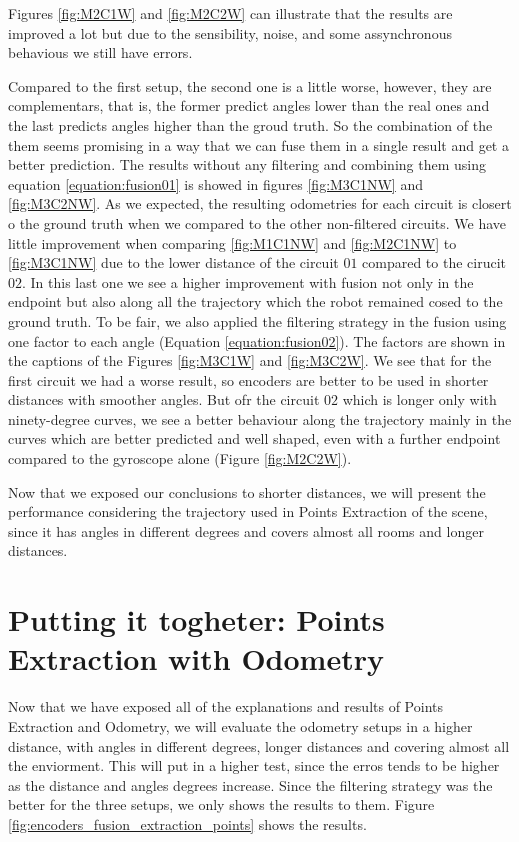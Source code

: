 \documentclass[twoside,conference,a4paper]{IEEEtran}
\begin{document}
Figures \ref{fig:M2C1W} and \ref{fig:M2C2W} can illustrate that the results are improved a lot but due to the sensibility, noise, and some assynchronous behavious we still have errors. \par
Compared to the first setup, the second one is a little worse, however, they are complementars, that is, the former
predict angles lower than the real ones and the last predicts angles higher than the groud truth. So the combination
of the them seems promising in a way that we can fuse them in a single result and get a better prediction. The results
without any filtering and combining them using equation \ref{equation:fusion01} is showed in figures \ref{fig:M3C1NW} and \ref{fig:M3C2NW}. As we expected, the resulting odometries for each circuit is closert o the ground truth when we 
compared to the other non-filtered circuits. We have little improvement when comparing \ref{fig:M1C1NW} and \ref{fig:M2C1NW} to \ref{fig:M3C1NW} due to the lower distance of the circuit $ 01 $ compared to the cirucit $ 02 $. In this
last one we see a higher improvement with fusion not only in the endpoint but also along all the trajectory which the
robot remained cosed to the ground truth. To be fair, we also applied the filtering strategy in the fusion using one factor to each angle (Equation \ref{equation:fusion02}). The factors are shown in the captions of the Figures \ref{fig:M3C1W} and \ref{fig:M3C2W}. We see that for the first circuit we had a worse result, so encoders are better to be
used in shorter distances with smoother angles. But ofr the circuit $ 02 $ which is longer only with ninety-degree curves, we see a better behaviour along the trajectory mainly in the curves which are better predicted and well shaped,
even with a further endpoint compared to the gyroscope alone (Figure \ref{fig:M2C2W}). \par
Now that we exposed our conclusions to shorter distances, we will present the performance considering the trajectory
used in Points Extraction of the scene, since it has angles in different degrees and covers almost all rooms and longer
distances.

\section{Putting it togheter: Points Extraction with Odometry}
Now that we have exposed all of the explanations and results of Points Extraction and Odometry, we will evaluate the
odometry setups in a higher distance, with angles in different degrees, longer distances and covering almost all the
enviorment. This will put in a higher test, since the erros tends to be higher as the distance and angles degrees
increase. Since the filtering strategy was the better for the three setups, we only shows the results to them. Figure
\ref{fig:encoders_fusion_extraction_points} shows the results.  
\end{document}

